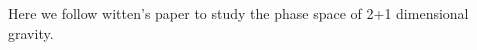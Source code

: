 Here we follow witten's paper \cite{witten21Dimensional1988} to study the phase space of 2+1 dimensional gravity.
